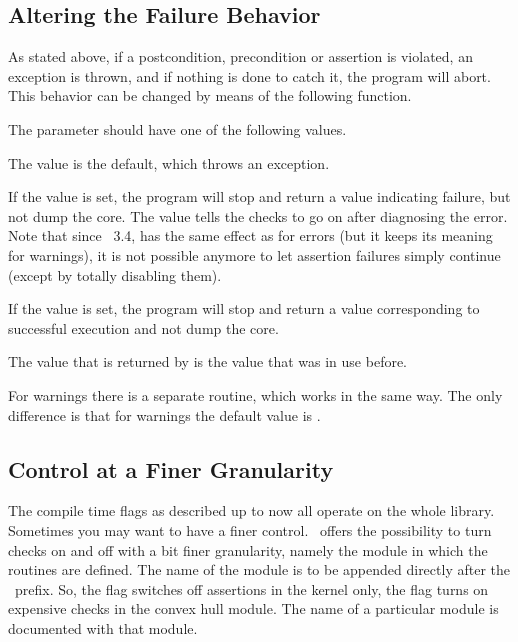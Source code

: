 \subsection{Altering the Failure Behavior}

As stated above, if a postcondition, precondition or assertion is
violated, an exception is thrown, and if nothing is done to catch it,
the program will abort.
This behavior can be changed by means of the following function.


\ccGlueBegin
{}
\ccGlueEnd

The parameter should have one of the following values.

The  value is the default, which throws an exception.

If the  value is set, the program will stop and return a value 
indicating failure, but not dump the core. 
The  value tells the checks to go on after diagnosing the error.
Note that since \cgal\ 3.4,  has the same effect as
 for errors (but it keeps its meaning for warnings), it is
not possible anymore to let assertion failures simply continue (except by
totally disabling them).

\begin{ccAdvanced}
If the  value is set, the program will stop and 
return a value corresponding to successful execution and not dump the core. 
\end{ccAdvanced}

The value that is returned by  is the value that was in use before.

For warnings there is a separate routine, which works in the same way.
The only difference is that for warnings the default value is
.

\ccGlueBegin
{}
\ccGlueEnd

\subsection{Control at a Finer Granularity}

The compile time flags as described up to now all operate on the whole 
library.
Sometimes you may want to have a finer control.
\cgal\ offers the possibility to turn checks on and off with a bit finer
granularity, namely the module in which the routines are defined.
The name of the module is to be appended directly after the \cgal\ prefix.
So, the flag  switches off assertions in 
the kernel only, the flag  turns on
expensive checks in the convex hull module.
The name of a particular module is documented with that module.

